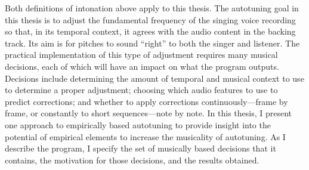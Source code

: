 Both definitions of intonation above apply to this thesis. The autotuning goal in this thesis is to adjust the fundamental frequency of the singing voice recording so that, in its temporal context, it agrees with the audio content in the backing track. Its aim is for pitches to sound ``right'' to both the singer and listener. The practical implementation of this type of adjustment requires many musical decisions, each of which will have an impact on what the program outputs. Decisions include determining the amount of temporal and musical context to use to determine a proper adjustment; choosing which audio features to use to predict corrections; and whether to apply corrections continuously---frame by frame, or constantly to short sequences---note by note. In this thesis, I present one approach to empirically based autotuning to provide insight into the potential of empirical elements to increase the musicality of autotuning. As I describe the program, I specify the set of musically based decisions that it contains, the motivation for those decisions, and the results obtained.  




